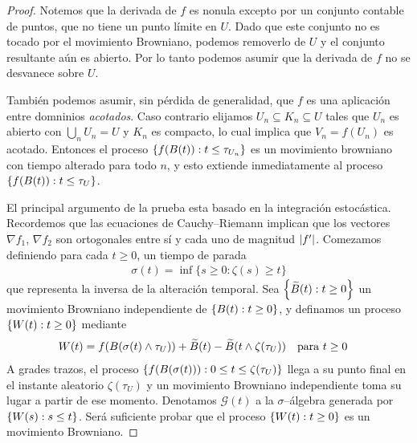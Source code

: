 \begin{proof}
  Notemos que la derivada de \(f\) es nonula excepto por un conjunto contable de puntos, que no tiene un punto límite en \(U\).
  Dado que este conjunto no es tocado por el movimiento Browniano, podemos removerlo de \(U\) y el conjunto resultante aún es abierto.
  Por lo tanto podemos asumir que la derivada de \(f\) no se desvanece sobre \(U\).

  También podemos asumir, sin pérdida de generalidad, que \(f\) es una aplicación entre domninios \emph{acotados}.
  Caso contrario elijamos \(U_n \subseteq K_n \subseteq U\) tales que \(U_n\) es abierto con \(\bigcup_n U_n = U\) y \(K_n\) es compacto, lo cual implica que \(V_n = f(U_n)\) es acotado.
  Entonces el proceso \(\{f(B(t)) : t \leq \tau_{U_n}\}\) es un movimiento browniano con tiempo alterado para todo \(n\), y esto extiende inmediatamente al proceso \(\{f(B(t)) : t \leq \tau_U\}\).

  El principal argumento de la prueba esta basado en la integración estocástica.
  Recordemos que las ecuaciones de Cauchy--Riemann implican que los vectores \(\nabla f_1\), \(\nabla f_2\) son ortogonales entre sí y cada uno de magnitud \(\lvert f'\rvert\).
  Comezamos definiendo para cada \(t \geq 0\), un tiempo de parada
  \begin{align}
    \sigma(t) = \inf \{s \geq 0 : \zeta(s) \geq t\}
  \end{align}
  que representa la inversa de la alteración temporal.
  Sea \(\left\{ \widetilde{B}(t) : t \geq 0 \right\}\) un movimiento Browniano independiente de \(\{B(t) : t \geq 0\}\), y definamos un proceso \(\{W(t) : t \geq 0\}\) mediante
  \begin{align}
    &W(t)
    =
    f(B(\sigma(t) \wedge \tau_U))
      + \widetilde{B}(t) - \widetilde{B}(t \wedge \zeta(\tau_U))
    &&\text{para } t \geq 0
  \end{align}
  A grades trazos, el proceso \(\{f(B(\sigma(t))) : 0 \leq t \leq \zeta(\tau_U)\}\) llega a su punto final en el instante aleatorio \(\zeta(\tau_U)\) y un movimiento Browniano independiente toma su lugar a partir de ese momento.
  Denotamos \(\mathcal{G}(t)\) a la \(\sigma\)--álgebra generada por \(\{W(s) : s \leq t\}\).
  Será suficiente probar que el proceso \(\{W(t) : t \geq 0\}\) es un movimiento Browniano.
  

\end{proof}
